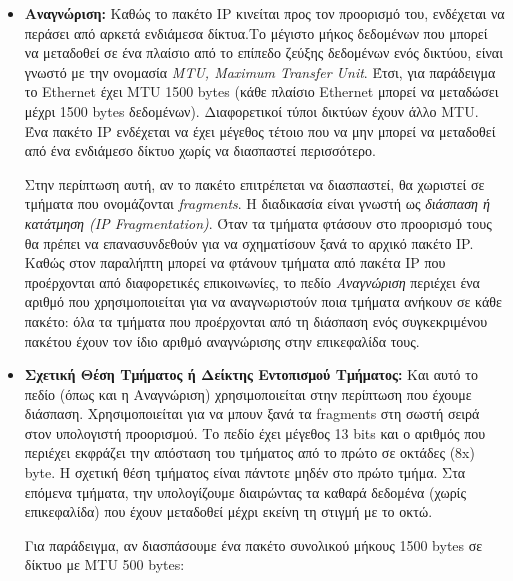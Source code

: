 \begin{itemize}
\item \textbf{Αναγνώριση:} Καθώς το πακέτο IP κινείται προς τον προορισμό του, ενδέχεται να περάσει από αρκετά ενδιάμεσα δίκτυα.Το μέγιστο μήκος δεδομένων που μπορεί να μεταδοθεί σε ένα πλαίσιο από το επίπεδο ζεύξης δεδομένων ενός δικτύου, είναι γνωστό με την ονομασία \emph{MTU, Maximum Transfer Unit}. Έτσι, για παράδειγμα το Ethernet έχει MTU 1500 bytes (κάθε πλαίσιο Ethernet μπορεί να μεταδώσει μέχρι 1500 bytes δεδομένων). Διαφορετικοί τύποι δικτύων έχουν άλλο MTU. Ένα πακέτο IP ενδέχεται να έχει μέγεθος τέτοιο που να μην μπορεί να μεταδοθεί από ένα ενδιάμεσο δίκτυο χωρίς να διασπαστεί περισσότερο. 

Στην περίπτωση αυτή, αν το πακέτο επιτρέπεται να διασπαστεί, θα χωριστεί σε τμήματα που ονομάζονται \emph{fragments}. Η διαδικασία είναι γνωστή ως \emph{διάσπαση ή κατάτμηση (IP Fragmentation)}. Όταν τα τμήματα φτάσουν στο προορισμό τους θα πρέπει να επανασυνδεθούν για να σχηματίσουν ξανά το αρχικό πακέτο IP. Καθώς στον παραλήπτη μπορεί να φτάνουν τμήματα από πακέτα IP που προέρχονται από διαφορετικές επικοινωνίες, το πεδίο \emph{Αναγνώριση} περιέχει ένα αριθμό που χρησιμοποιείται για να αναγνωριστούν ποια τμήματα ανήκουν σε κάθε πακέτο: όλα τα τμήματα που προέρχονται από τη διάσπαση ενός συγκεκριμένου πακέτου έχουν τον ίδιο αριθμό αναγνώρισης στην επικεφαλίδα τους.

\item \textbf{Σχετική Θέση Τμήματος ή Δείκτης Εντοπισμού Τμήματος:} Και αυτό το πεδίο (όπως και η Αναγνώριση) χρησιμοποιείται στην περίπτωση που έχουμε διάσπαση. Χρησιμοποιείται για να μπουν ξανά τα fragments στη σωστή σειρά στον υπολογιστή προορισμού. Το πεδίο έχει μέγεθος 13 bits και ο αριθμός που περιέχει εκφράζει την απόσταση του τμήματος από το πρώτο σε οκτάδες (8x) byte. Η σχετική θέση τμήματος είναι πάντοτε μηδέν στο πρώτο τμήμα. Στα επόμενα τμήματα, την υπολογίζουμε διαιρώντας τα καθαρά δεδομένα (χωρίς επικεφαλίδα) που έχουν μεταδοθεί μέχρι εκείνη τη στιγμή  με το οκτώ.

Για παράδειγμα, αν διασπάσουμε ένα πακέτο συνολικού μήκους 1500 bytes σε δίκτυο με MTU 500 bytes:


\end{itemize}
